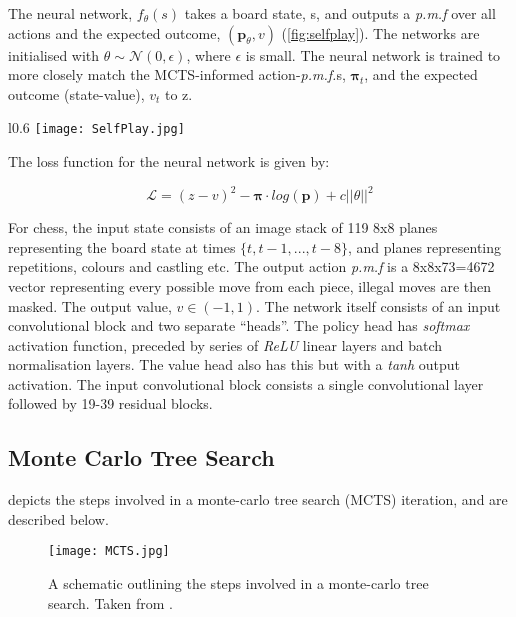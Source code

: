 \documentclass[../main.tex]{subfiles}
\begin{document}
The neural network, $f_\theta(s)$ takes a board state, s, and outputs a \textit{p.m.f} over all actions and the expected outcome, $(\boldsymbol{p}_\theta, v)$ (\cref{fig:selfplay}). The networks are initialised with $\theta \sim \mathcal{N}(0, \epsilon)$, where $\epsilon$ is small. The neural network is trained to more closely match the MCTS-informed action-\textit{p.m.f.}s, $\boldsymbol{\pi}_t$, and the expected outcome (state-value), $v_t$ to z.

\begin{wrapfigure}{l}{0.6\textwidth}
   \centering
   \texttt{[image: SelfPlay.jpg]}
   \caption{A schematic showing how self-play and policy training are performed. Taken from \cite{AlphaGoZero}.}
   \label{fig:selfplay}
   \vspace{0.5cm}
\end{wrapfigure}

The loss function for the neural network is given by:

\begin{equation}
    \mathcal{L} = (z - v)^2 - \boldsymbol{\pi} \cdot log(\boldsymbol{p}) + c||\theta||^2
   \label{eqn:loss}
\end{equation}

For chess, the input state consists of an image stack of 119 8x8 planes representing the board state at times $ \{ t, t-1, ..., t-8 \} $, and planes representing repetitions, colours and castling etc. The output action \textit{p.m.f} is a 8x8x73=4672 vector representing every possible move from each piece, illegal moves are then masked. The output value, $v \in (-1, 1)$. 
The network itself consists of an input convolutional block and two separate ``heads''. The policy head has \textit{softmax} activation function, preceded by series of \textit{ReLU} linear layers and batch normalisation layers. The value head also has this but with a \textit{tanh} output activation. The input convolutional block consists a single convolutional layer followed by 19-39 residual blocks.

\subsection{Monte Carlo Tree Search}
\label{sec:mctsintro}
 depicts the steps involved in a monte-carlo tree search (MCTS) iteration, and are described below.

\begin{figure}[H]
   \centering
   \texttt{[image: MCTS.jpg]}
   \caption{\label{fig:MCTS} A schematic outlining the steps involved in a monte-carlo tree search. Taken from \cite{AlphaGoZero}.}
\end{figure}
\end{document}
